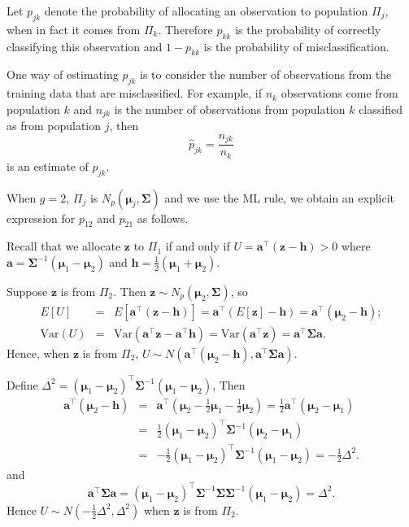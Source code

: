 \documentclass[]{book}
\theoremstyle{definition}
\theoremstyle{definition}
\theoremstyle{definition}
\theoremstyle{remark}
\begin{document}
Let \(p_{jk}\) denote the probability of allocating an observation to population \(\Pi_j\), when in fact it comes from \(\Pi_k\). Therefore \(p_{kk}\) is the probability of correctly classifying this observation and \(1-p_{kk}\) is the probability of misclassification.

One way of estimating \(p_{jk}\) is to consider the number of observations from the training data that are misclassified. For example, if \(n_k\) observations come from population \(k\) and \(n_{jk}\) is the number of observations from population \(k\) classified as from population \(j\), then
\[ \hat{p}_{jk} = \frac{n_{jk}}{n_k} \]
is an estimate of \(p_{jk}\).

When \(g=2\), \(\Pi_j\) is \(N_p(\boldsymbol \mu_j, \boldsymbol \Sigma)\) and we use the ML rule, we obtain an explicit expression for \(p_{12}\) and \(p_{21}\) as follows.

Recall that we allocate \(\boldsymbol z\) to \(\Pi_1\) if and only if \(U = \boldsymbol a^\top (\boldsymbol z-\boldsymbol h)>0\) where \(\boldsymbol a= \boldsymbol \Sigma^{-1} (\boldsymbol \mu_1 - \boldsymbol \mu_2)\) and \(\boldsymbol h= \frac{1}{2} (\boldsymbol \mu_1 + \boldsymbol \mu_2)\).

Suppose \(\boldsymbol z\) is from \(\Pi_2\). Then \(\boldsymbol z\sim N_p(\boldsymbol \mu_2,\boldsymbol \Sigma)\), so
\begin{eqnarray*}
E[U] &=& E[\boldsymbol a^\top (\boldsymbol z-\boldsymbol h)] = \boldsymbol a^\top (E[\boldsymbol z] -\boldsymbol h) = \boldsymbol a^\top (\boldsymbol \mu_2-\boldsymbol h); \\
\text{Var}(U) &=& \text{Var}(\boldsymbol a^\top \boldsymbol z- \boldsymbol a^\top \boldsymbol h) = \text{Var}(\boldsymbol a^\top \boldsymbol z) = \boldsymbol a^\top \boldsymbol \Sigma\boldsymbol a.
\end{eqnarray*}
Hence, when \(\boldsymbol z\) is from \(\Pi_2\), \(U \sim N(\boldsymbol a^\top (\boldsymbol \mu_2 - \boldsymbol h), \boldsymbol a^\top \boldsymbol \Sigma\boldsymbol a)\).

Define \(\Delta^2 = (\boldsymbol \mu_1-\boldsymbol \mu_2)^\top \boldsymbol \Sigma^{-1} (\boldsymbol \mu_1-\boldsymbol \mu_2)\), Then
\begin{eqnarray*}
\boldsymbol a^\top (\boldsymbol \mu_2-\boldsymbol h) &=& \boldsymbol a^\top \left(\boldsymbol \mu_2 - \frac{1}{2}\boldsymbol \mu_1 - \frac{1}{2}\boldsymbol \mu_2 \right)= \frac{1}{2} \boldsymbol a^\top (\boldsymbol \mu_2 - \boldsymbol \mu_1) \\
&=& \frac{1}{2} (\boldsymbol \mu_1 - \boldsymbol \mu_2)^\top \boldsymbol \Sigma^{-1} (\boldsymbol \mu_2 - \boldsymbol \mu_1) \\
&=& -\frac{1}{2} (\boldsymbol \mu_1 - \boldsymbol \mu_2)^\top \boldsymbol \Sigma^{-1} (\boldsymbol \mu_1 - \boldsymbol \mu_2) = -\frac{1}{2}\Delta^2.
\end{eqnarray*}
and
\[ \boldsymbol a^\top \boldsymbol \Sigma\boldsymbol a= (\boldsymbol \mu_1 - \boldsymbol \mu_2)^\top \boldsymbol \Sigma^{-1} \boldsymbol \Sigma\boldsymbol \Sigma^{-1} (\boldsymbol \mu_1 - \boldsymbol \mu_2) = \Delta ^2. \]
Hence \(U \sim N( -\frac{1}{2}\Delta^2, \Delta^2)\) when \(\boldsymbol z\) is from \(\Pi_2\).
\end{document}
